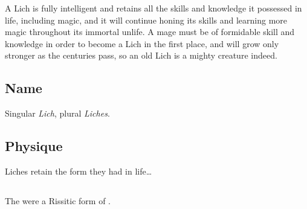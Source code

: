 A Lich is fully intelligent and retains all the skills and knowledge it possessed in life, including magic, and it will continue honing its skills and learning more magic throughout its immortal unlife. A mage must be of formidable skill and knowledge in order to become a Lich in the first place, and will grow only stronger as the centuries pass, so an old Lich is a mighty creature indeed. 









\subsection{Name}
Singular \emph{Lich}, plural \emph{Liches}. 









\subsection{Physique}
Liches retain the form they had in life\ldots{}









\subsection{\XulGann}
The  were a Rissitic form of \Liches. 















